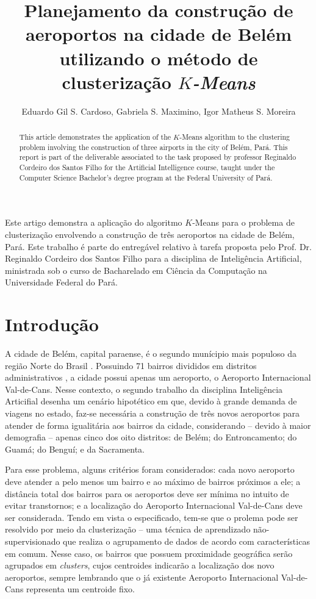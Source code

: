 \documentclass[12pt]{article}
\title{Planejamento da construção de aeroportos na cidade de Belém utilizando o método de clusterização \textit{$K$-Means}}
\author{Eduardo Gil S. Cardoso\inst{1}, Gabriela S. Maximino\inst{1}, Igor Matheus S. Moreira\inst{1}}
\begin{document}
 

\maketitle

\begin{abstract}
  This article demonstrates the application of the $K$-Means algorithm to the clustering problem involving the construction of three airports in the city of Belém, Pará. This report is part of the deliverable associated to the task proposed by professor Reginaldo Cordeiro dos Santos Filho for the Artificial Intelligence course, taught under the Computer Science Bachelor's degree program at the Federal University of Pará.
\end{abstract}
     
\begin{resumo} 
  Este artigo demonstra a aplicação do algoritmo $K$-Means para o problema de clusterização envolvendo a construção de três aeroportos na cidade de Belém, Pará. Este trabalho é parte do entregável relativo à tarefa proposta pelo Prof. Dr. Reginaldo Cordeiro dos Santos Filho para a disciplina de Inteligência Artificial, ministrada sob o curso de Bacharelado em Ciência da Computação na Universidade Federal do Pará.
\end{resumo}



\section{Introdução} %



A cidade de Belém, capital paraense, é o segundo munícipio mais populoso da região Norte do Brasil \cite{ibge}. Possuindo 71 bairros divididos em distritos administrativos \cite{belemwiki}, a cidade possui apenas um aeroporto, o Aeroporto Internacional Val-de-Cans. Nesse contexto, o segundo trabalho da disciplina Inteligência Articifial desenha um cenário hipotético em que, devido à grande demanda de viagens no estado, faz-se necessária a construção de três novos aeroportos para atender de forma igualitária aos bairros da cidade, considerando -- devido à maior demografia -- apenas cinco dos oito distritos: de Belém; do Entroncamento; do Guamá; do Benguí; e da Sacramenta.

Para esse problema, alguns critérios foram considerados: cada novo aeroporto deve atender a pelo menos um bairro e ao máximo de bairros próximos a ele; a distância total dos bairros para os aeroportos deve ser mínima no intuito de evitar transtornos; e a localização do Aeroporto Internacional Val-de-Cans deve ser considerada. Tendo em vista o especificado, tem-se que o prolema pode ser resolvido por meio da clusterização -- uma técnica de aprendizado não-supervisionado que realiza o agrupamento de dados de acordo com características em comum. Nesse caso, os bairros que possuem proximidade geográfica serão agrupados em \textit{clusters}, cujos centroides indicarão a localização dos novo aeroportos, sempre lembrando que o já existente Aeroporto Internacional Val-de-Cans representa um centroide fixo.
\end{document}
